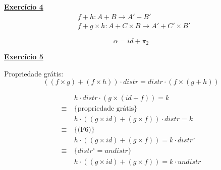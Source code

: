 \documentclass[a4paper,11pt]{article}
\begin{document}
	\noindent \underline{\textbf{Exercício 4}}
	\[
	\begin{aligned}
		&f + h: A + B \rightarrow A' + B' \\
		&f + g \times h: A + C \times B \rightarrow A' + C' \times B'
	\end{aligned}
	\]
	
	\begin{figure}[H]
		\centering
	\end{figure}
	
	\[
	\alpha = id + \pi_2
	\]

	\noindent \underline{\textbf{Exercício 5}}
	
	\begin{figure}[H]
		\centering
	\end{figure}
	
	\noindent Propriedade grátis:
	\[
	((f \times g) + (f \times h)) \cdot distr = distr \cdot (f \times (g + h))
	\]
	
	\[
	\begin{aligned}
		& h \cdot distr \cdot (g \times (id + f)) = k \\
		\equiv \  &\{\text{propriedade grátis}\}\\
		& h \cdot ((g \times id) + (g \times f)) \cdot distr = k \\
		\equiv \  &\{\text{(F6)}\}\\
		& h \cdot ((g \times id) + (g \times f)) = k \cdot distr^{\circ} \\
		\equiv \  &\{\text{$distr^{\circ} = undistr$}\}\\
		& h \cdot ((g \times id) + (g \times f)) = k \cdot undistr \\
	\end{aligned}
	\]
	
\end{document}
